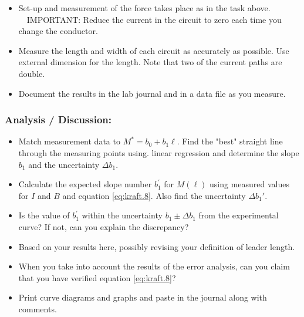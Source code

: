 \documentclass[../Elmag-labhefte-2020.tex]{subfiles}
\begin{document}
%
\begin{itemize}
\vspace{-4mm}
    \item Set-up and measurement of the force takes place as in the task above.
    \ \ IMPORTANT: Reduce the current in the circuit to zero each time you change the conductor.
    \item Measure the length and width of each circuit as accurately as possible. Use external dimension for the length. Note that two of the current paths are double.
    \item Document the results in the lab journal and in a data file as you measure.
\end{itemize}

\subsubsection{Analysis / Discussion:}

\vspace{-4mm}
\begin{itemize}
    \item Match measurement data to $M^\ast = b_0 + b_1\ell$. Find the "best" straight line through the measuring points using. linear regression and determine the slope $b_1$ and the uncertainty $\Delta b_1$.
    \item Calculate the expected slope number $b_1^\prime$ for $M(\ell)$ using measured values   for $I$ and $B$ and equation \eqref{eq:kraft.8}. Also find the uncertainty $\Delta b_1'$.
    \item Is the value of $b_1^\prime$ within the uncertainty $b_1 \pm \Delta b_1$ from the experimental curve? If not, can you explain the discrepancy?
    \item Based on your results here, possibly revising your definition of leader length.
    \item When you take into account the results of the error analysis, can you claim that you have verified equation \eqref{eq:kraft.8}?
    \item Print curve diagrams and graphs and paste in the journal along with comments.
\end{itemize}
\end{document}
